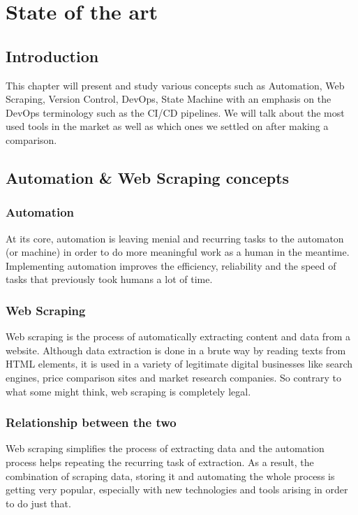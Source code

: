 \chapter{ State of the art }
\setcounter{secnumdepth}{3}
\newpage

\section*{Introduction}
This chapter will present and study various concepts such as Automation, Web Scraping, Version Control, DevOps, State Machine with an emphasis on the DevOps terminology such as the CI/CD pipelines. We will talk about the most used tools in the market as well as which ones we settled on after making a comparison.

\section{Automation \& Web Scraping concepts}
\subsection{Automation}
At its core, automation is leaving menial and recurring tasks to the automaton (or machine) in order to do more meaningful work as a human in the meantime. Implementing automation improves the efficiency, reliability and the speed of tasks that previously took humans a lot of time.
\subsection{Web Scraping}
Web scraping is the process of automatically extracting content and data from a website. Although data extraction is done in a brute way by reading texts from HTML elements, it is used in a variety of legitimate digital businesses like search engines, price comparison sites and market research companies. So contrary to what some might think, web scraping is completely legal.
\subsection{Relationship between the two}
Web scraping simplifies the process of extracting data and the automation process helps repeating the recurring task of extraction. As a result, the combination of scraping data, storing it and automating the whole process is getting very popular, especially with new technologies and tools arising in order to do just that.

